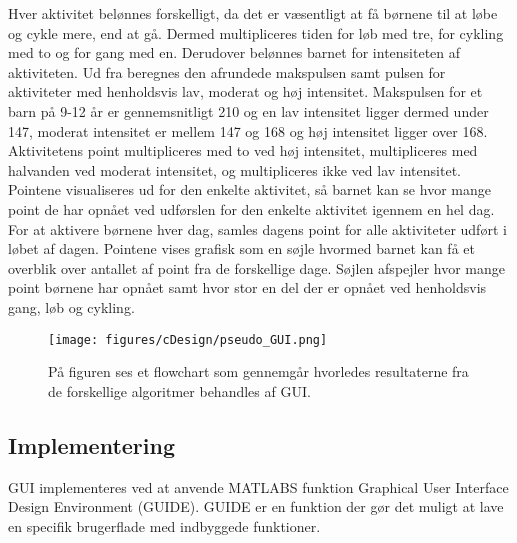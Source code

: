 Hver aktivitet belønnes forskelligt, da det er væsentligt at få børnene til at løbe og cykle mere, end at gå. Dermed multipliceres tiden for løb med tre, for cykling med to og for gang med en. Derudover belønnes barnet for intensiteten af aktiviteten. Ud fra  beregnes den afrundede makspulsen samt pulsen for aktiviteter med henholdsvis lav, moderat og høj intensitet. Makspulsen for et barn på 9-12 år er gennemsnitligt 210 og en lav intensitet ligger dermed under 147, moderat intensitet er mellem 147 og 168 og høj intensitet ligger over 168. Aktivitetens point multipliceres med to ved høj intensitet, multipliceres med halvanden ved moderat intensitet, og multipliceres ikke ved lav intensitet. Pointene visualiseres ud for den enkelte aktivitet, så barnet kan se hvor mange point de har opnået ved udførslen for den enkelte aktivitet igennem en hel dag. For at aktivere børnene hver dag, samles dagens point for alle aktiviteter udført i løbet af dagen. Pointene vises grafisk som en søjle hvormed barnet kan få et overblik over antallet af point fra de forskellige dage. Søjlen afspejler hvor mange point børnene har opnået samt hvor stor en del der er opnået ved henholdsvis gang, løb og cykling.  

\begin{figure}[H]
	\centering
	\texttt{[image: figures/cDesign/pseudo\_GUI.png]}
	\caption{På figuren ses et flowchart som gennemgår hvorledes resultaterne fra de forskellige algoritmer behandles af GUI.}
	\label{fig:GUI}
\end{figure}

\subsection{Implementering}
GUI implementeres ved at anvende MATLABS funktion Graphical User Interface Design Environment (GUIDE). GUIDE er en funktion der gør det muligt at lave en specifik brugerflade med indbyggede funktioner.

